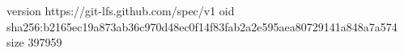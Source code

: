 version https://git-lfs.github.com/spec/v1
oid sha256:b2165ec19a873ab36c970d48ec0f14f83fab2a2e595aea80729141a848a7a574
size 397959

